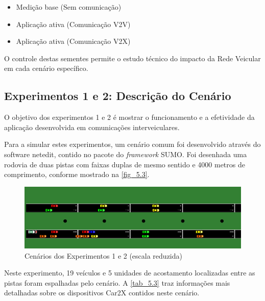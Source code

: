 \documentclass[
12pt,				%
openright,			%
oneside,			%
a4paper,			%
brazil,				%
]{abntex2}
\begin{document}
	\begin{itemize}
		\item Medição base (Sem comunicação)
		\item Aplicação ativa (Comunicação V2V)
		\item Aplicação ativa (Comunicação V2X)
	\end{itemize}
	
	\par O controle destas sementes permite o estudo técnico do impacto da Rede Veicular em cada cenário específico.

	\subsection{Experimentos 1 e 2: Descrição do Cenário}
	
	\par O objetivo dos experimentos 1 e 2 é mostrar o funcionamento e a efetividade da aplicação desenvolvida em comunicações interveiculares.
	
	\par Para a simular estes experimentos, um cenário comum foi desenvolvido através do  software netedit, contido no pacote do \textit{framework} SUMO. Foi desenhada uma rodovia de duas pistas com faixas duplas de mesmo sentido e 4000 metros de comprimento, conforme mostrado na \autoref{fig_5.3}.
	
	 \begin{figure}[H]
	 	\centering
	 	\includegraphics[scale=.355]{figuras/cap5/53CenarioExperimentos1e2}
	 	\caption{\label{fig_5.3}Cenários dos Experimentos 1 e 2 (escala reduzida)}
	 \end{figure}
	 
	 \par Neste experimento, 19 veículos e 5 unidades de acostamento localizadas entre as pistas foram espalhadas pelo cenário. A \autoref{tab_5.3} traz informações mais detalhadas sobre os dispositivos Car2X contidos neste cenário.
	 
\end{document}
